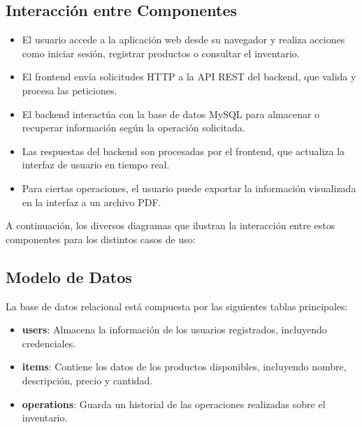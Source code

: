 
\subsection{Interacción entre Componentes}

\begin{itemize}
    \item El usuario accede a la aplicación web desde su navegador y realiza acciones como iniciar sesión, registrar productos o consultar el inventario.
    \item El frontend envía solicitudes HTTP a la API REST del backend, que valida y procesa las peticiones.
    \item El backend interactúa con la base de datos MySQL para almacenar o recuperar información según la operación solicitada.
    \item Las respuestas del backend son procesadas por el frontend, que actualiza la interfaz de usuario en tiempo real.
    \item Para ciertas operaciones, el usuario puede exportar la información visualizada en la interfaz a un archivo PDF.
\end{itemize}

A continuación, los diversos diagramas que ilustran la interacción entre estos componentes para los distintos casos de uso:


\subsection{Modelo de Datos}

La base de datos relacional está compuesta por las siguientes tablas principales:

\begin{itemize}
    \item \textbf{users}: Almacena la información de los usuarios registrados, incluyendo credenciales.
    \item \textbf{items}: Contiene los datos de los productos disponibles, incluyendo nombre, descripción, precio y cantidad.
    \item \textbf{operations}: Guarda un historial de las operaciones realizadas sobre el inventario.
\end{itemize}

